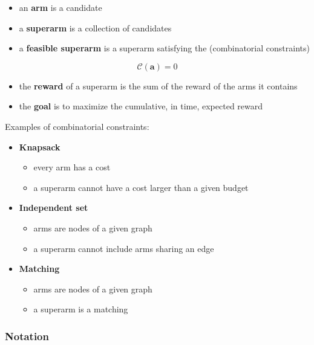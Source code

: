 \documentclass[10pt,a4paper]{article}
\begin{document}
\begin{itemize}
\item an \textbf{arm} is a candidate
\item a \textbf{superarm} is a collection of candidates
\item a \textbf{feasible superarm} is a superarm satisfying the (combinatorial constraints)
\end{itemize}

$$\mathscr{C}(\mathbf{a})= 0$$

\begin{itemize}

\item the \textbf{reward} of a superarm is the sum of the reward of the arms it contains
\item the \textbf{goal} is to maximize the cumulative, in time, expected reward
\end{itemize}

Examples of combinatorial constraints:

\begin{itemize}
\item \textbf{Knapsack}
\begin{itemize}
\item every arm has a cost
\item a superarm cannot have a cost larger than a given budget
\end{itemize}
\item \textbf{Independent set}
\begin{itemize}
\item arms are nodes of a given graph
\item a superarm cannot include arms sharing an edge
\end{itemize}
\item \textbf{Matching}
\begin{itemize}
\item arms are nodes of a given graph
\item a superarm is a matching
\end{itemize}
\end{itemize}

\subsubsection{Notation}\label{notation}
\end{document}
